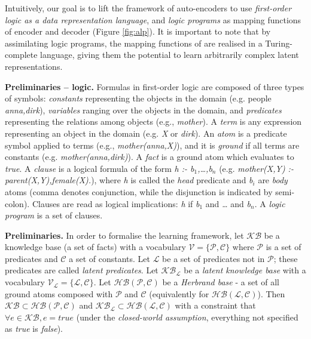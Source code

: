 Intuitively, our goal is to lift the framework of auto-encoders to use \textit{first-order logic as a data representation language},  and \textit{logic programs} as mapping functions of encoder and decoder (Figure \ref{fig:alp}).
It is important to note that by assimilating logic programs, the mapping functions of  are realised in a Turing-complete language, giving them the potential to learn arbitrarily complex latent representations.




\textbf{Preliminaries -- logic.}
Formulas in first-order logic are composed of three types of symbols: \textit{constants} representing the objects in the domain (e.g. people \textit{anna,dirk}), \textit{variables} ranging over the objects in the domain, and \textit{predicates} representing the relations among objects (e.g., \textit{mother}).
A \textit{term} is any expression representing an object in the domain (e.g. \textit{X} or \textit{dirk}).
An \textit{atom} is a predicate symbol applied to terms (e.g., \textit{mother(anna,X)}), and it is \textit{ground} if all terms are constants (e.g. \textit{mother(anna,dirk)}).
A \textit{fact} is a ground atom which evaluates to \textit{true}.
A \textit{clause} is a logical formula of the form \textit{h :- b$_1$,\ldots,b$_n$} (e.g. \textit{mother(X,Y) :- parent(X,Y),female(X).}), where \textit{h} is called the \textit{head} predicate and \textit{b$_i$} are \textit{body} atoms (comma denotes conjunction, while the disjunction is indicated by semi-colon).
Clauses are read as logical implications: \textit{h} if \textit{b$_1$} and \textit{\ldots} and \textit{b$_n$}.
A \textit{logic program} is a set of clauses.



\textbf{Preliminaries.} 
In order to formalise the learning framework, let $\mathcal{KB}$ be a knowledge base (a set of facts) with a vocabulary $\mathcal{V} = \{ \mathcal{P}, \mathcal{C}\}$ where $\mathcal{P}$ is a set of predicates and $\mathcal{C}$ a set of constants.
Let $\mathcal{L}$ be a set of predicates not in $\mathcal{P}$; these predicates are called \textit{latent predicates}.
Let $\mathcal{KB}_{\mathcal{L}}$ be a \textit{latent knowledge base} with a vocabulary $\mathcal{V}_{\mathcal{L}} = \{\mathcal{L}, \mathcal{C}\}$.
Let $\mathcal{HB(P,C)}$ be a \textit{Herbrand base} - a set of all ground atoms composed with $\mathcal{P}$ and $\mathcal{C}$ (equivalently for $\mathcal{HB(L,C)}$).
Then $\mathcal{KB} \subset \mathcal{HB(P,C)}$ and $\mathcal{KB}_{\mathcal{L}} \subset \mathcal{HB(L,C)}$ with a constraint that $\forall e \in \mathcal{KB}, e = true$ (under the \textit{closed-world assumption}, everything not specified as \textit{true} is \textit{false}).



